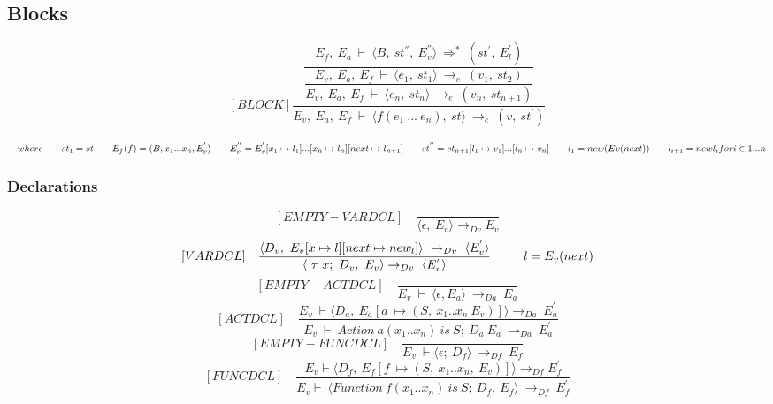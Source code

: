\subsection{Blocks}
\[	
[BLOCK]	
\dfrac{\dfrac{E_f, \ E_a \ \vdash \ \langle B, \ st^{''}, \ E_v^{''} \rangle \ \Rightarrow^* \ (st^{'}, \ E_l^{'})}{\dfrac{E_v, \ E_a, \ E_f \ \vdash \ \langle e_1, \ st_1 \rangle \ \rightarrow_e \ (v_1, \ st_2)}{E_v, \ E_a, \ E_f \ \vdash \ \langle e_n, \ st_n \rangle \ \rightarrow_e \ (v_n, \ st_{n+1})}}}{E_v, \ E_a, \ E_f \ \vdash \ \langle f(e_1 \ ... \ e_n), \ st \rangle \ \rightarrow_e \ (v, \ st^{'})}	
\]

\begin{math}		
	\quad where \newline		
	\qquad st_1 = st \newline		
	\qquad E_f(f) = (B, x_1 ... x_n, E_v^{'}) \newline		
	\qquad E_v^{''} = E_v^{'}[x_1 \mapsto l_1] ... [x_n \mapsto l_n] [next \mapsto l_{n+1}] \newline		
	\qquad st^{''} = st_{n+1}[l_1 \mapsto v_1] ... [l_n \mapsto v_n] \newline		
	\qquad l_1 = new (Ev(next)) \newline		
	\qquad l_{i+1}= new l_i for i \in {1 ... n}		
\end{math}

\subsubsection{Declarations}	
\[	
[EMPTY-VARDCL] \quad	
\dfrac{}{\langle\epsilon, \ E_v\rangle \rightarrow_{Dv} E_v}	
\]\newline
\[	
[VARDCL] \quad	
\dfrac{ \langle D_v, \ E_v[x \mapsto l][next \mapsto new_l]\rangle \ \rightarrow_{Dv} \ \langle E_v^{'} \rangle }{ \langle \ \tau \ x; \ D_v,\ E_v \rangle \rightarrow_{Dv} \ \langle E_v^{'} \rangle } \newline	
\qquad \ \ l = E_v(next)	
\]\newline
\[	
[EMPTY-ACTDCL] \quad	
\dfrac{}{E_v \ \vdash \ \langle \epsilon, E_a \rangle \ \rightarrow_{Da} \ E_a}	
\]\newline
\[	
[ACTDCL] \quad	
\dfrac{E_v \ \vdash \langle D_a, \ E_a[a \ \mapsto (S, \ x_1 .. x_n \ E_v)] \rangle \rightarrow_{Da} \ E_a^{'}}{E_v \ \vdash \ Action \ a(x_1 .. x_n) \ is \ S; \ D_a \ E_a \ \rightarrow_{Da} \ E_a^{'}}	
\]\newline
\[	
[EMPTY-FUNCDCL] \quad	
\dfrac{}{E_v \ \vdash \langle \epsilon; \ D_f \rangle \ \rightarrow_{Df} \ E_f}	
\]\newline
\[	
[FUNCDCL] \quad	
\dfrac{E_v \vdash \langle D_f, \ E_f[f \ \mapsto (S, \ x_1 .. x_n, \ E_v)] \rangle \rightarrow_{Df} E_f^{'}}{E_v \vdash \ \langle Function \ f(x_1 .. x_n) \ is \ S; \ D_f, \ E_f \rangle \ \rightarrow_{Df} \ E_f^{'}}	
\]

